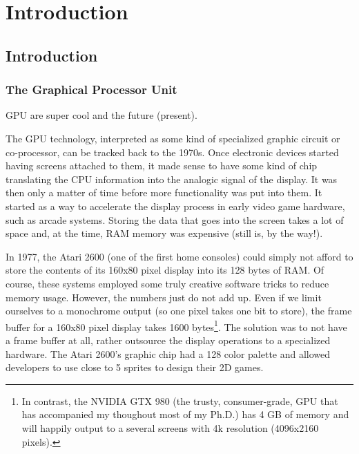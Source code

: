 \documentclass[ twoside,openright,titlepage,numbers=noenddot,%
headinclude,footinclude,cleardoublepage=empty,abstract=on,
BCOR=5mm,paper=a4,fontsize=11pt
]{scrreprt}
\newcommand{\gpu}{\gls{GPU}\xspace}
\begin{document}
\frenchspacing
\raggedbottom
{} %
\pagestyle{plain}




\cleardoublepage
\cleardoublepage
\cleardoublepage
\cleardoublepage
\cleardoublepage

\cleardoublepage
\pagestyle{scrheadings}
\cleardoublepage
\part{Introduction}\label{pt:intro}
\chapter{Introduction}\label{ch:introduction}
\section{The Graphical Processor Unit}
\gpu are super cool and the future (present).

The \gpu technology, interpreted as some kind of specialized graphic circuit or co-processor, can be tracked back to the 1970s. Once electronic devices started having screens attached to them, it made sense to have some kind of chip translating the CPU information into the analogic signal of the display. It was then only a matter of time before more functionality was put into them. It started as a way to accelerate the display process in early video game hardware, such as arcade systems.
Storing the data that goes into the screen takes a lot of space and, at the time, RAM memory was expensive (still is, by the way!).

In 1977, the Atari 2600 (one of the first home consoles) could simply not afford to store the contents of its 160x80 pixel display into its 128 bytes of RAM. Of course, these systems employed some truly creative software tricks to reduce memory usage. However, the numbers just do not add up. Even if we limit ourselves to a monochrome output (so one pixel takes one bit to store), the frame buffer for a 160x80 pixel display takes 1600 bytes\footnote{In contrast, the NVIDIA GTX 980 (the trusty, consumer-grade, GPU that has accompanied my thoughout most of my Ph.D.) has 4 GB of memory and will happily output to a several screens with 4k resolution (4096x2160 pixels).}.
The solution was to not have a frame buffer at all, rather outsource the display operations to a specialized hardware. The Atari 2600's graphic chip had a 128 color palette and allowed developers to use close to 5 sprites to design their 2D games.
\end{document}
